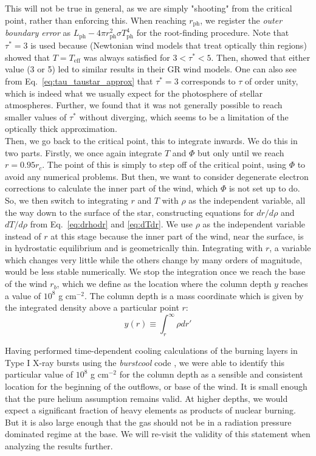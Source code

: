 \documentclass[../main.tex]{subfiles}
\newcommand{\ph}{_\text{ph}}
\begin{document}
This will not be true in general, as we are simply "shooting" from the critical point, rather than enforcing this. When reaching $r\ph$, we register the \textit{outer boundary error} as $L\ph-4\pi r\ph^2\sigma T\ph^4$ for the root-finding procedure. Note that $\tau^*=3$ is used because \citet{Quinn1985} (Newtonian wind models that treat optically thin regions) showed that $T=T_\text{eff}$ was always satisfied for $3<\tau^*<5$. Then, \citet{Paczynski1986b} showed that either value (3 or 5) led to similar results in their GR wind models. One can also see from Eq.~\eqref{eq:tau_taustar_approx} that $\tau
^*=3$ corresponds to $\tau$ of order unity, which is indeed what we usually expect for the photosphere of stellar atmospheres. Further, we found that it was not generally possible to reach smaller values of $\tau^*$ without diverging, which seems to be a limitation of the optically thick approximation.\\

Then, we go back to the critical point, this to integrate inwards. We do this in two parts. Firstly, we once again integrate $T$ and $\Phi$ but only until we reach $r=0.95 r_c$. The point of this is simply to step off of the critical point, using $\Phi$ to avoid any numerical problems. But then, we want to consider degenerate electron corrections to calculate the inner part of the wind, which $\Phi$ is not set up to do. So, we then switch to integrating $r$ and $T$ with $\rho$ as the independent variable, all the way down to the surface of the star, constructing equations for $dr/d\rho$ and  $dT/d\rho$ from Eq.~\eqref{eq:drhodr} and \eqref{eq:dTdr}. We use $\rho$ as the independent variable instead of $r$ at this stage because the inner part of the wind, near the surface, is in hydrostatic equilibrium and is geometrically thin. Integrating with $r$, a variable which changes very little while the others change by many orders of magnitude, would be less stable numerically. We stop the integration once we reach the base of the wind $r_b$, which we define as the location where the column depth $y$ reaches a value of $10
^8$ g cm$^{-2}$. The column depth is a mass coordinate which is given by the integrated density above a particular point $r$:
\begin{equation}
    y(r)\equiv \int_r^\infty \rho dr'
\end{equation}

Having performed time-dependent cooling calculations of the burning layers in Type I X-ray bursts using the \textit{burstcool} code \citep{Cumming2004,Cumming2006}, we were able to identify this particular value of $10^8$ g cm$^{-2}$ for the column depth as a sensible and consistent location for the beginning of the outflows, or base of the wind. It is small enough that the pure helium assumption remains valid. At higher depths, we would expect a significant fraction of heavy elements as products of nuclear burning. But it is also large enough that the gas should not be in a radiation pressure dominated regime at the base. We will re-visit the validity of this statement when analyzing the results further. \\
\end{document}
